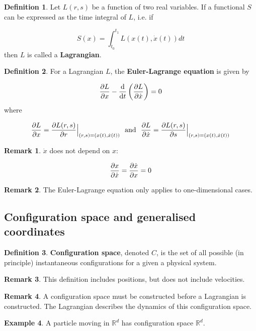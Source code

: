\documentclass[12pt,a4paper]{article}
\theoremstyle{definition}
\newtheorem{definition}{Definition}[subsection]
\newtheorem{example}[definition]{Example}
\newtheorem*{remark}{Remark}
\begin{document}
\begin{definition}
	Let $L(r, s)$ be a function of two real variables. If a functional $S$ can be expressed as the time integral of $L$, i.e. if

	\[ S(x) = \int_{t_0}^{t_1} L(x(t), \dot{x}(t)) dt \]
	then $L$ is called a \textbf{Lagrangian}.
\end{definition}

\begin{definition}
	For a Lagrangian $L$, the \textbf{Euler-Lagrange equation} is given by

	\[ \diffp{L}{x} - \diff{}{t} \left( \diffp{L}{\dot{x}} \right) = 0 \]
	where

	\[ \diffp{L}{x} = \diffp{L(r, s)}{r} \Big|_{(r, s) = (x(t), \dot{x}(t))} \text{ \ and \ } \diffp{L}{\dot{x}} = \diffp{L(r, s)}{s} \Big|_{(r, s) = (x(t), \dot{x}(t))} \]
\end{definition}

\begin{remark}
	$\dot{x}$ does not depend on $x$:

	\[ \diffp{x}{\dot{x}} = \diffp{\dot{x}}{x} = 0 \]
\end{remark}

\begin{remark}
	The Euler-Lagrange equation only applies to one-dimensional cases.
\end{remark}

\subsection{Configuration space and generalised coordinates}

\begin{definition}
	\textbf{Configuration space}, denoted $C$, is the set of all possible (in principle) instantaneous configurations for a given a physical system.
\end{definition}

\begin{remark}
	This definition includes positions, but does not include velocities.
\end{remark}

\begin{remark}
	A configuration space must be constructed before a Lagrangian is constructed. The Lagrangian describes the dynamics of this configuration space.
\end{remark}

\begin{example}
	A particle moving in $\mathbb{R}^d$ has configuration space $\mathbb{R}^d$.
\end{example}
\end{document}
